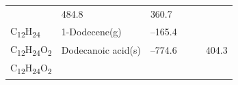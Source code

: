 \documentclass[
]{book}
\theoremstyle{definition}
\theoremstyle{definition}
\theoremstyle{definition}
\theoremstyle{remark}
\begin{document}
\begin{longtable}[]{@{}llllll@{}}
\begin{minipage}[t]{0.15\columnwidth}
\strut
\end{minipage} & \begin{minipage}[t]{0.14\columnwidth}\raggedright
484.8\strut
\end{minipage} & \begin{minipage}[t]{0.14\columnwidth}\raggedright
360.7\strut
\end{minipage}\tabularnewline
\begin{minipage}[t]{0.07\columnwidth}\raggedright
C\textsubscript{12}H\textsubscript{24}\strut
\end{minipage} & \begin{minipage}[t]{0.17\columnwidth}\raggedright
1-Dodecene(g)\strut
\end{minipage} & \begin{minipage}[t]{0.15\columnwidth}\raggedright
--165.4\strut
\end{minipage} & \begin{minipage}[t]{0.15\columnwidth}\raggedright
\strut
\end{minipage} & \begin{minipage}[t]{0.14\columnwidth}\raggedright
\strut
\end{minipage} & \begin{minipage}[t]{0.14\columnwidth}\raggedright
\strut
\end{minipage}\tabularnewline
\begin{minipage}[t]{0.07\columnwidth}\raggedright
C\textsubscript{12}H\textsubscript{24}O\textsubscript{2}\strut
\end{minipage} & \begin{minipage}[t]{0.17\columnwidth}\raggedright
Dodecanoic acid(s)\strut
\end{minipage} & \begin{minipage}[t]{0.15\columnwidth}\raggedright
--774.6\strut
\end{minipage} & \begin{minipage}[t]{0.15\columnwidth}\raggedright
\strut
\end{minipage} & \begin{minipage}[t]{0.14\columnwidth}\raggedright
\strut
\end{minipage} & \begin{minipage}[t]{0.14\columnwidth}\raggedright
404.3\strut
\end{minipage}\tabularnewline
\begin{minipage}[t]{0.07\columnwidth}\raggedright
C\textsubscript{12}H\textsubscript{24}O\textsubscript{2}\strut
\end{minipage} & \begin{minipage}[t]{0.17\columnwidth}\raggedright

\end{minipage}
\end{longtable}
\end{document}
